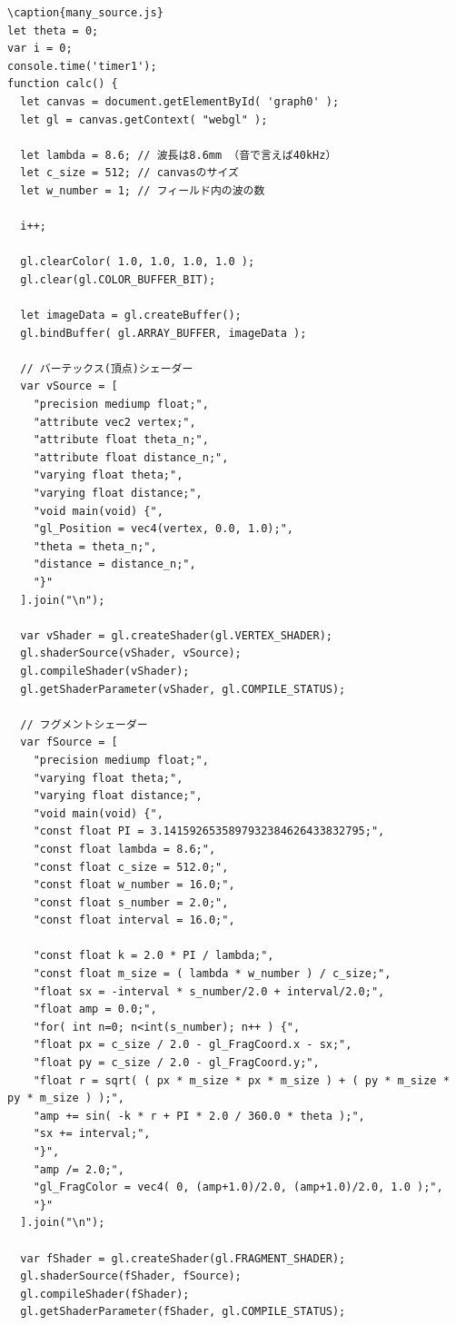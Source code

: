 \documentclass[a4j,12pt]{jsarticle}
\begin{document}
\begin{lstlisting}
\caption{many_source.js}
let theta = 0;
var i = 0;
console.time('timer1');
function calc() {
  let canvas = document.getElementById( 'graph0' );
  let gl = canvas.getContext( "webgl" );

  let lambda = 8.6; // 波長は8.6mm （音で言えば40kHz）
  let c_size = 512; // canvasのサイズ
  let w_number = 1; // フィールド内の波の数

  i++;

  gl.clearColor( 1.0, 1.0, 1.0, 1.0 );
  gl.clear(gl.COLOR_BUFFER_BIT);

  let imageData = gl.createBuffer();
  gl.bindBuffer( gl.ARRAY_BUFFER, imageData );

  // バーテックス(頂点)シェーダー
  var vSource = [
    "precision mediump float;",
    "attribute vec2 vertex;",
    "attribute float theta_n;",
    "attribute float distance_n;",
    "varying float theta;",
    "varying float distance;",
    "void main(void) {",
    "gl_Position = vec4(vertex, 0.0, 1.0);",
    "theta = theta_n;",
    "distance = distance_n;",
    "}"
  ].join("\n");

  var vShader = gl.createShader(gl.VERTEX_SHADER);
  gl.shaderSource(vShader, vSource);
  gl.compileShader(vShader);
  gl.getShaderParameter(vShader, gl.COMPILE_STATUS);

  // フグメントシェーダー
  var fSource = [
    "precision mediump float;",
    "varying float theta;",
    "varying float distance;",
    "void main(void) {",
    "const float PI = 3.1415926535897932384626433832795;",
    "const float lambda = 8.6;",
    "const float c_size = 512.0;",
    "const float w_number = 16.0;",
    "const float s_number = 2.0;",
    "const float interval = 16.0;",

    "const float k = 2.0 * PI / lambda;",
    "const float m_size = ( lambda * w_number ) / c_size;",
    "float sx = -interval * s_number/2.0 + interval/2.0;",
    "float amp = 0.0;",
    "for( int n=0; n<int(s_number); n++ ) {",
    "float px = c_size / 2.0 - gl_FragCoord.x - sx;",
    "float py = c_size / 2.0 - gl_FragCoord.y;",
    "float r = sqrt( ( px * m_size * px * m_size ) + ( py * m_size * py * m_size ) );",
    "amp += sin( -k * r + PI * 2.0 / 360.0 * theta );",
    "sx += interval;",
    "}",
    "amp /= 2.0;",
    "gl_FragColor = vec4( 0, (amp+1.0)/2.0, (amp+1.0)/2.0, 1.0 );",
    "}"
  ].join("\n");

  var fShader = gl.createShader(gl.FRAGMENT_SHADER);
  gl.shaderSource(fShader, fSource);
  gl.compileShader(fShader);
  gl.getShaderParameter(fShader, gl.COMPILE_STATUS);



\end{lstlisting}
\end{document}
